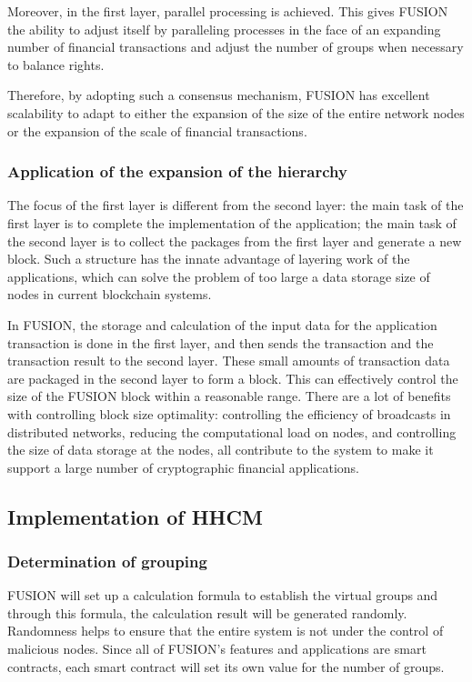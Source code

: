 \documentclass[a4paper,12pt]{article}
\begin{document}
Moreover, in the first layer, parallel processing is achieved. This gives FUSION the ability to adjust itself by paralleling processes in the face of an expanding number of financial transactions and adjust the number of groups when necessary to balance rights.

Therefore, by adopting such a consensus mechanism, FUSION has excellent scalability to adapt to either the expansion of the size of the entire network nodes or the expansion of the scale of financial transactions.

\subsubsection {Application of the expansion of the hierarchy}

The focus of the first layer is different from the second layer: the main task of the first layer is to complete the implementation of the application; the main task of the second layer is to collect the packages from the first layer and generate a new block. Such a structure has the innate advantage of layering work of the applications, which can solve the problem of too large a data storage size of nodes in current blockchain systems.

In FUSION, the storage and calculation of the input data for the application transaction is done in the first layer, and then sends the transaction and the transaction result to the second layer. These small amounts of transaction data are packaged in the second layer to form a block. This can effectively control the size of the FUSION block within a reasonable range. There are a lot of benefits with controlling block size optimality: controlling the efficiency of broadcasts in distributed networks, reducing the computational load on nodes, and controlling the size of data storage at the nodes, all contribute to the system to make it support a large number of cryptographic financial applications.

\subsection {Implementation of HHCM}

\subsubsection {Determination of grouping}

FUSION will set up a calculation formula to establish the virtual groups and through this formula, the calculation result will be generated randomly. Randomness helps to ensure that the entire system is not under the control of malicious nodes. Since all of FUSION's features and applications are smart contracts, each smart contract will set its own value for the number of groups.
\end{document}
